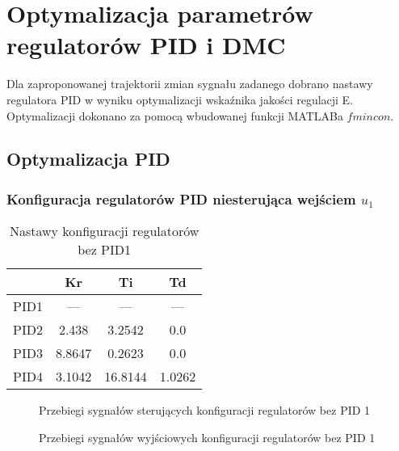 \section{Optymalizacja parametrów regulatorów PID i DMC}
\label{projekt:zad5}


Dla zaproponowanej trajektorii zmian sygnału zadanego dobrano nastawy
regulatora PID w wyniku optymalizacji wskaźnika jakości regulacji E.
Optymalizacji dokonano za pomocą wbudowanej funkcji MATLABa $fmincon$.

\subsection{Optymalizacja PID}

\subsubsection{Konfiguracja regulatorów PID niesterująca wejściem $u_{1}$}

\begin{table}[H]
    \centering
    \begin{tabular}{|l|c|c|c|}
    \hline
         & Kr  & Ti  & Td  \\ \hline
    PID1 & --- & --- & --- \\ \hline
    PID2 & 2.438 & 3.2542 & 0.0 \\ \hline
    PID3 & 8.8647 & 0.2623 & 0.0 \\ \hline
    PID4 & 3.1042 & 16.8144 & 1.0262 \\ \hline
    \end{tabular}
    \caption[H]{Nastawy konfiguracji regulatorów bez PID1}
\end{table}


\ifdefined\CompileFigures
\begin{figure}[H] 
    \centering
    
    \caption{Przebiegi sygnałów sterujących konfiguracji regulatorów bez PID 1}
    \label{projekt:zad5:figure:projzadanie5PIDbezu1u}
\end{figure}
\fi

\ifdefined\CompileFigures
\begin{figure}[H] 
    \centering
    
    \caption{Przebiegi sygnałów wyjściowych konfiguracji regulatorów bez PID 1}
    \label{projekt:zad5:figure:projzadanie5PIDbezu1y}
\end{figure}
\fi

